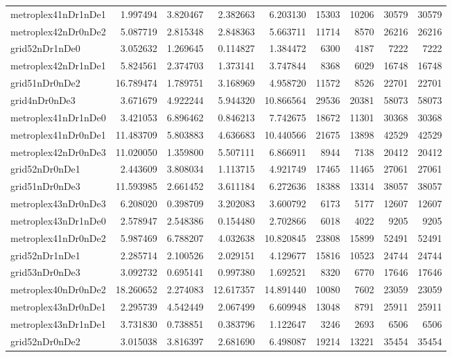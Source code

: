 \begin{longtable}{|l|r|r|r|r|r|r|r|r|}
metroplex41nDr1nDe1 & 1.997494 & 3.820467 & 2.382663 & 6.203130 & 15303 & 10206 & 30579 & 30579 \\
metroplex42nDr0nDe2 & 5.087719 & 2.815348 & 2.848363 & 5.663711 & 11714 & 8570 & 26216 & 26216 \\
grid52nDr1nDe0 & 3.052632 & 1.269645 & 0.114827 & 1.384472 & 6300 & 4187 & 7222 & 7222 \\
metroplex42nDr1nDe1 & 5.824561 & 2.374703 & 1.373141 & 3.747844 & 8368 & 6029 & 16748 & 16748 \\
grid51nDr0nDe2 & 16.789474 & 1.789751 & 3.168969 & 4.958720 & 11572 & 8526 & 22701 & 22701 \\
grid4nDr0nDe3 & 3.671679 & 4.922244 & 5.944320 & 10.866564 & 29536 & 20381 & 58073 & 58073 \\
metroplex41nDr1nDe0 & 3.421053 & 6.896462 & 0.846213 & 7.742675 & 18672 & 11301 & 30368 & 30368 \\
metroplex41nDr0nDe1 & 11.483709 & 5.803883 & 4.636683 & 10.440566 & 21675 & 13898 & 42529 & 42529 \\
metroplex42nDr0nDe3 & 11.020050 & 1.359800 & 5.507111 & 6.866911 & 8944 & 7138 & 20412 & 20412 \\
grid52nDr0nDe1 & 2.443609 & 3.808034 & 1.113715 & 4.921749 & 17465 & 11465 & 27061 & 27061 \\
grid51nDr0nDe3 & 11.593985 & 2.661452 & 3.611184 & 6.272636 & 18388 & 13314 & 38057 & 38057 \\
metroplex43nDr0nDe3 & 6.208020 & 0.398709 & 3.202083 & 3.600792 & 6173 & 5177 & 12607 & 12607 \\
metroplex43nDr1nDe0 & 2.578947 & 2.548386 & 0.154480 & 2.702866 & 6018 & 4022 & 9205 & 9205 \\
metroplex41nDr0nDe2 & 5.987469 & 6.788207 & 4.032638 & 10.820845 & 23808 & 15899 & 52491 & 52491 \\
grid52nDr1nDe1 & 2.285714 & 2.100526 & 2.029151 & 4.129677 & 15816 & 10523 & 24744 & 24744 \\
grid53nDr0nDe3 & 3.092732 & 0.695141 & 0.997380 & 1.692521 & 8320 & 6770 & 17646 & 17646 \\
metroplex40nDr0nDe2 & 18.260652 & 2.274083 & 12.617357 & 14.891440 & 10080 & 7602 & 23059 & 23059 \\
metroplex43nDr0nDe1 & 2.295739 & 4.542449 & 2.067499 & 6.609948 & 13048 & 8791 & 25911 & 25911 \\
metroplex43nDr1nDe1 & 3.731830 & 0.738851 & 0.383796 & 1.122647 & 3246 & 2693 & 6506 & 6506 \\
grid52nDr0nDe2 & 3.015038 & 3.816397 & 2.681690 & 6.498087 & 19214 & 13221 & 35454 & 35454 \\

\end{longtable}
